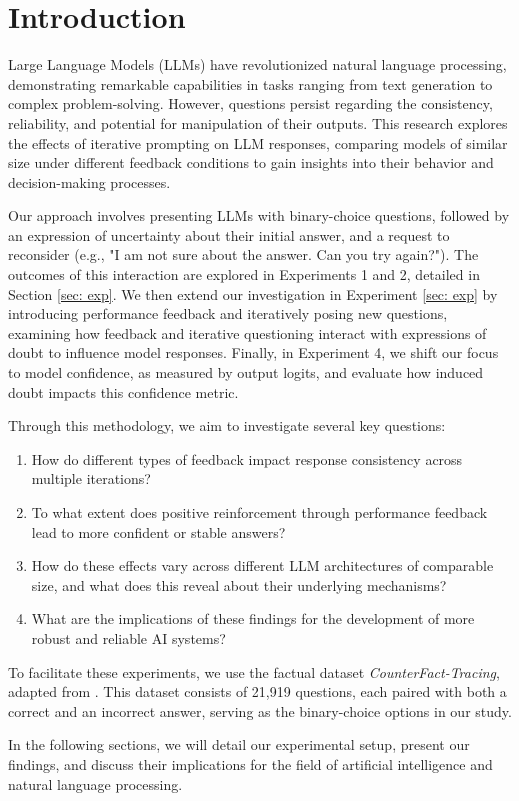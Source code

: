 \section{Introduction}
Large Language Models (LLMs) have revolutionized natural language processing, demonstrating remarkable capabilities in tasks ranging from text generation to complex problem-solving\cite{bubeck2023sparksartificialgeneralintelligence, bommasani2022opportunitiesrisksfoundationmodels}. However, questions persist regarding the consistency, reliability, and potential for manipulation of their outputs. This research explores the effects of iterative prompting on LLM responses, comparing models of similar size under different feedback conditions to gain insights into their behavior and decision-making processes. 

Our approach involves presenting LLMs with binary-choice questions, followed by an expression of uncertainty about their initial answer, and a request to reconsider (e.g., "I am not sure about the answer. Can you try again?"). The outcomes of this interaction are explored in Experiments 1 and 2, detailed in Section \ref{sec: exp}. We then extend our investigation in Experiment \ref{sec: exp} by introducing performance feedback and iteratively posing new questions, examining how feedback and iterative questioning interact with expressions of doubt to influence model responses. Finally, in Experiment 4, we shift our focus to model confidence, as measured by output logits, and evaluate how induced doubt impacts this confidence metric. 

Through this methodology, we aim to investigate several key questions:
\begin{enumerate}
\item How do different types of feedback impact response consistency across multiple iterations?
\item To what extent does positive reinforcement through performance feedback lead to more confident or stable answers?
\item How do these effects vary across different LLM architectures of comparable size, and what does this reveal about their underlying mechanisms?
\item What are the implications of these findings for the development of more robust and reliable AI systems?
\end{enumerate}
To facilitate these experiments, we use the factual dataset \textit{CounterFact-Tracing}, adapted from \cite{meng2022locating}. This dataset consists of 21,919 questions, each paired with both a correct and an incorrect answer, serving as the binary-choice options in our study.

In the following sections, we will detail our experimental setup, present our findings, and discuss their implications for the field of artificial intelligence and natural language processing.